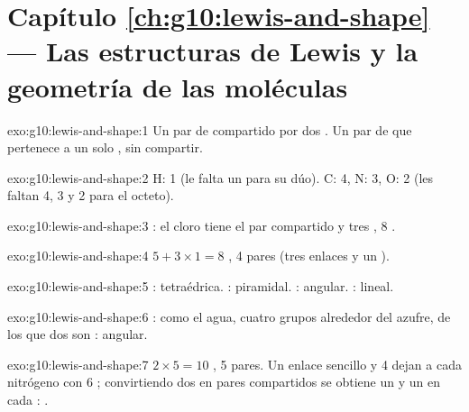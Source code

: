 \section*{Capítulo \ref{ch:g10:lewis-and-shape} --- Las estructuras de Lewis y la geometría de las moléculas}

\begin{solution}{exo:g10:lewis-and-shape:1}
Un par de  compartido por dos . Un par de  que pertenece a un solo , sin compartir.
\end{solution}

\begin{solution}{exo:g10:lewis-and-shape:2}
H: 1 (le falta un  para su dúo). C: 4, N: 3, O: 2 (les faltan 4,
3 y 2  para el octeto).
\end{solution}

\begin{solution}{exo:g10:lewis-and-shape:3}
: el cloro tiene el par compartido y tres , 8 .
\end{solution}

\begin{solution}{exo:g10:lewis-and-shape:4}
$5 + 3 \times 1 = 8$ , 4 pares (tres enlaces y un ).
\end{solution}

\begin{solution}{exo:g10:lewis-and-shape:5}
: tetraédrica. : piramidal. : angular.
: lineal.
\end{solution}

\begin{solution}{exo:g10:lewis-and-shape:6}
: como el agua, cuatro grupos alrededor del azufre,
de los que dos son : angular.
\end{solution}

\begin{solution}{exo:g10:lewis-and-shape:7}
$2 \times 5 = 10$ , 5 pares. Un enlace sencillo y 4  dejan a cada nitrógeno con 6 ; convirtiendo dos
 en pares compartidos se obtiene un  y
un  en cada :
.
\end{solution}

